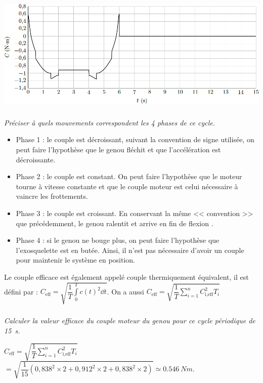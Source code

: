 \begin{multicols}{2}
\begin{center}
\includegraphics[width=.8\linewidth]{images/fig_12}
\end{center}


\subparagraph{} \textit{Préciser à quels mouvements correspondent les 4 phases de ce cycle.}

\ifprof
\begin{corrige}
\begin{itemize}
\item Phase 1 : le couple est décroissant, suivant la convention de signe utilisée, on peut faire l'hypothèse que le genou fléchit et que l’accélération est décroissante.
\item Phase 2 : le couple est constant. On peut faire l'hypothèse que le moteur tourne à vitesse constante et que le couple moteur est celui nécessaire à vaincre les frottements. 
\item Phase 3 : le couple est croissant. En conservant la même << convention >> que précédemment, le genou ralentit et arrive en fin de flexion .
\item Phase 4 : si le genou ne bouge plus, on peut faire l'hypothèse que l'exosquelette est en butée. Ainsi, il n'est pas nécessaire d'avoir un couple pour maintenir le système en position.
\end{itemize}
\end{corrige}
\else
\fi

Le couple efficace est également appelé couple thermiquement équivalent, il est défini par :
$C_{\text{eff}}=\sqrt{\dfrac{1}{T}\int\limits_0^Tc(t)^2 \dd t}$. On a aussi 
$C_{\text{eff}}=\sqrt{\dfrac{1}{T}\sum\limits_{i=1}^n C_{\text{i,eff}}^2 T_i }$


\fi

\subparagraph{} \textit{Calculer la valeur efficace du couple moteur du genou pour ce cycle périodique de \SI{15}{s}.}

\ifprof
\begin{corrige}
$C_{\text{eff}}=\sqrt{\dfrac{1}{T}\sum\limits_{i=1}^n C_{\text{i,eff}}^2 T_i }$
$=\sqrt{\dfrac{1}{15}\left(0,838^2 \times 2 +0,912^2 \times 2 + 0,838^2 \times 2 \right) }\simeq \SI{0,546}{Nm}$.
\end{corrige}
\else
\fi



\end{multicols}
